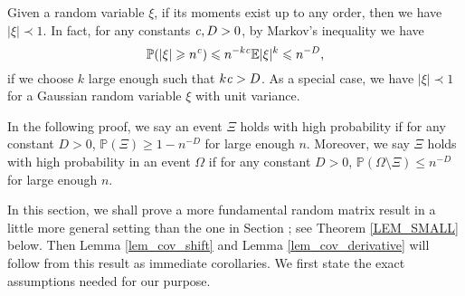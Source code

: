 \begin{example}\label{example stoc}
Given a random variable $\xi$, if its moments exist up to any order, then we have $|\xi|\prec 1$. In fact, for any constants ${\mathit{c}}, D>0$, by Markov's inequality we have 
$$ \mathbb{P}(|\xi|\geqslant n^{{\mathit{c}}})\leqslant n^{-k{\mathit{c}}}{\mathbb{E} |\xi|^k}\leqslant n^{-D},$$
if we choose $k$ large enough such that $k{\mathit{c}}>D$. As a special case, we have $|\xi|\prec 1$ for a Gaussian random variable $\xi$ with unit variance.
\end{example}

In the following proof, we say an event $\Xi$ holds with high probability if for any constant $D>0$, $\mathbb P(\Xi)\ge 1- n^{-D}$ for large enough $n$. Moreover, we say $\Xi$ holds with high probability in an event $\Omega$ if for any constant $D>0$, $\mathbb P(\Omega\setminus \Xi)\le n^{-D}$ for large enough $n$.

In this section, we shall prove a more fundamental random matrix result in a little more general setting than the one in Section ; see Theorem \ref{LEM_SMALL} below. %
 Then Lemma \ref{lem_cov_shift} and Lemma \ref{lem_cov_derivative} will follow from this result as immediate corollaries. We first state the exact assumptions needed for our purpose.

